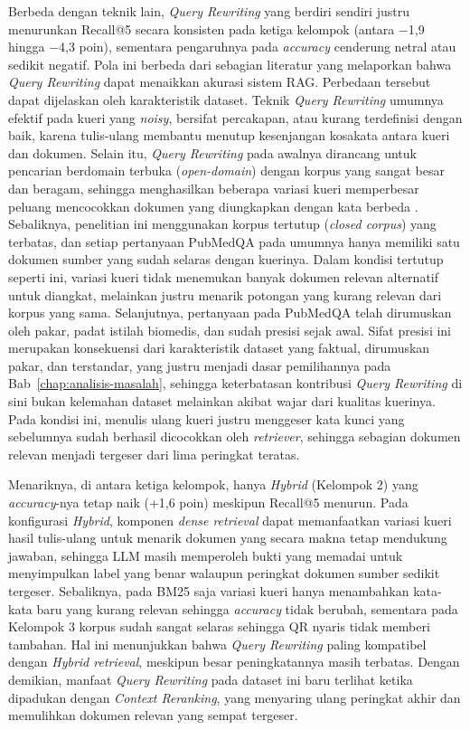 Berbeda dengan teknik lain, \textit{Query Rewriting} yang berdiri sendiri justru menurunkan Recall@5 secara konsisten pada ketiga kelompok (antara $-$1{,}9 hingga $-$4{,}3 poin), sementara pengaruhnya pada \textit{accuracy} cenderung netral atau sedikit negatif. Pola ini berbeda dari sebagian literatur yang melaporkan bahwa \textit{Query Rewriting} dapat menaikkan akurasi sistem RAG. Perbedaan tersebut dapat dijelaskan oleh karakteristik dataset. Teknik \textit{Query Rewriting} umumnya efektif pada kueri yang \textit{noisy}, bersifat percakapan, atau kurang terdefinisi dengan baik, karena tulis-ulang membantu menutup kesenjangan kosakata antara kueri dan dokumen. Selain itu, \textit{Query Rewriting} pada awalnya dirancang untuk pencarian berdomain terbuka (\textit{open-domain}) dengan korpus yang sangat besar dan beragam, sehingga menghasilkan beberapa variasi kueri memperbesar peluang mencocokkan dokumen yang diungkapkan dengan kata berbeda \parencite{ma2023queryrewriting}. Sebaliknya, penelitian ini menggunakan korpus tertutup (\textit{closed corpus}) yang terbatas, dan setiap pertanyaan PubMedQA pada umumnya hanya memiliki satu dokumen sumber yang sudah selaras dengan kuerinya. Dalam kondisi tertutup seperti ini, variasi kueri tidak menemukan banyak dokumen relevan alternatif untuk diangkat, melainkan justru menarik potongan yang kurang relevan dari korpus yang sama. Selanjutnya, pertanyaan pada PubMedQA telah dirumuskan oleh pakar, padat istilah biomedis, dan sudah presisi sejak awal. Sifat presisi ini merupakan konsekuensi dari karakteristik dataset yang faktual, dirumuskan pakar, dan terstandar, yang justru menjadi dasar pemilihannya pada Bab~\ref{chap:analisis-masalah}, sehingga keterbatasan kontribusi \textit{Query Rewriting} di sini bukan kelemahan dataset melainkan akibat wajar dari kualitas kuerinya. Pada kondisi ini, menulis ulang kueri justru menggeser kata kunci yang sebelumnya sudah berhasil dicocokkan oleh \textit{retriever}, sehingga sebagian dokumen relevan menjadi tergeser dari lima peringkat teratas.

Menariknya, di antara ketiga kelompok, hanya \textit{Hybrid} (Kelompok 2) yang \textit{accuracy}-nya tetap naik (+1{,}6 poin) meskipun Recall@5 menurun. Pada konfigurasi \textit{Hybrid}, komponen \textit{dense retrieval} dapat memanfaatkan variasi kueri hasil tulis-ulang untuk menarik dokumen yang secara makna tetap mendukung jawaban, sehingga LLM masih memperoleh bukti yang memadai untuk menyimpulkan label yang benar walaupun peringkat dokumen sumber sedikit tergeser. Sebaliknya, pada BM25 saja variasi kueri hanya menambahkan kata-kata baru yang kurang relevan sehingga \textit{accuracy} tidak berubah, sementara pada Kelompok 3 korpus sudah sangat selaras sehingga QR nyaris tidak memberi tambahan. Hal ini menunjukkan bahwa \textit{Query Rewriting} paling kompatibel dengan \textit{Hybrid retrieval}, meskipun besar peningkatannya masih terbatas. Dengan demikian, manfaat \textit{Query Rewriting} pada dataset ini baru terlihat ketika dipadukan dengan \textit{Context Reranking}, yang menyaring ulang peringkat akhir dan memulihkan dokumen relevan yang sempat tergeser.

